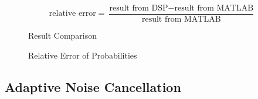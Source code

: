 \begin{equation}
\label{eq:relative_error}
\text{relative error} = \frac{\text{result from DSP} - \text{result from MATLAB}}{\text{result from MATLAB}}
\end{equation}

\begin{figure}[H]
\begin{minipage}[t]{0.5\linewidth}
\centering
{}
\caption{Result Comparison}
\label{probability_comparison}
\end{minipage}
\begin{minipage}[t]{0.5\linewidth}
\centering
{}
\caption{Relative Error of Probabilities}
\label{probability_error}
\end{minipage}
\end{figure}


\subsection{Adaptive Noise Cancellation}
